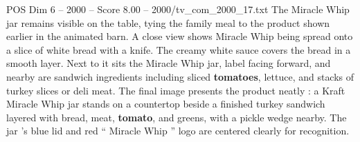 \begin{textsample}{POS Dim 6 – 2000 – Score 8.00 – 2000/tv\_com\_2000\_17.txt}
The Miracle Whip jar remains visible on the table, tying the family meal to the product shown earlier in the animated barn.
A close view shows Miracle Whip being spread onto a slice of white bread with a knife.
The creamy white sauce covers the bread in a smooth layer.
Next to it sits the Miracle Whip jar, label facing forward, and nearby are sandwich ingredients including sliced \textbf{tomatoes}, lettuce, and stacks of turkey slices or deli meat.
The final image presents the product neatly : a Kraft Miracle Whip jar stands on a countertop beside a finished turkey sandwich layered with bread, meat, \textbf{tomato}, and greens, with a pickle wedge nearby.
The jar ’s blue lid and red “ Miracle Whip ” logo are centered clearly for recognition.

\end{textsample}
